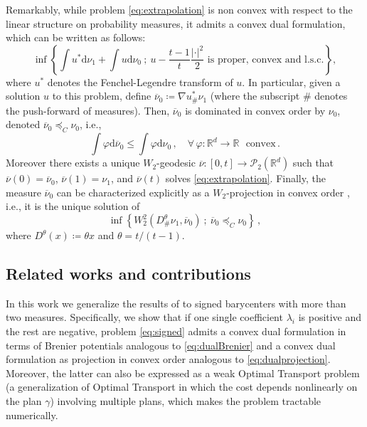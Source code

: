 \documentclass[12pt]{amsart}
\numberwithin{equation}{section}
\let\mc=\mathcal
\def\ed{\mathrm{d}}
\theoremstyle{plain}
\theoremstyle{definition}
\begin{document}
Remarkably, while problem \eqref{eq:extrapolation} is non convex with respect to the linear structure on probability measures, it admits a convex dual formulation, which can be written as follows:
\begin{equation}\label{eq:dualBrenier} 
\inf \left \{ \int u^* \mathrm{d} \nu_1  + \int u \mathrm{d} \nu_0 ~;~ u - \frac{t-1}{t} \frac{|\cdot|^2}{2} \text{ is proper, convex {and l.s.c.}} \right\},
\end{equation}
where $u^*$ denotes the Fenchel-Legendre transform of $u$.
In particular, given a solution $u$ to this problem, define $\overline{\nu}_0 \coloneqq \nabla u^*_\# \nu_1$ (where the subscript $\#$ denotes the push-forward of measures). Then, $\overline{\nu}_0$ is dominated in convex order by $\nu_0$, denoted $\overline{\nu}_0 \preceq_C \nu_0$, i.e.,
\[
\int \varphi \ed \overline{\nu}_0 \leq \int \varphi \ed \nu_0 \,, \quad \forall \, \varphi:\mathbb{R}^d \rightarrow \mathbb{R} ~~~ \text{convex}\,.
\]
Moreover there exists a unique $W_2$-geodesic $\overline{\nu}:[0,t] \rightarrow \mc{P}_2(\mathbb{R}^d)$ such that $\overline{\nu}(0) = \overline{\nu}_0$,  $\overline{\nu}(1) = \nu_1$, and  $\overline{\nu}(t)$ solves \eqref{eq:extrapolation}. Finally, the measure $\overline{\nu}_0$ can be characterized explicitly as a $W_2$-projection in convex order \cite{kim2026stability}, i.e., it is the unique solution of
\begin{equation}\label{eq:dualprojection}
\inf \left\{ W^2_2 (D^\theta_\# \nu_1, \overline{\nu}_0) ~;~  \overline{\nu}_0 \preceq_C \nu_0 \right\}\,,
\end{equation}
where $D^\theta(x) \coloneqq  \theta x$ and $\theta = t/(t-1)$.

\subsection{Related works and contributions} In this work we 
generalize the results of \cite{gallouet2025metric} to signed barycenters with more than two measures. Specifically, we show that if one single coefficient $\lambda_i$ is positive and the rest are negative, problem \eqref{eq:signed} admits a convex dual formulation in terms of Brenier potentials analogous to \eqref{eq:dualBrenier} and a convex dual formulation as projection in convex order analogous to \eqref{eq:dualprojection}. Moreover, the latter can also be expressed as a weak Optimal Transport problem \cite{gozlan2017kantorovich,gozlan2020mixture} (a  generalization of Optimal Transport in which the cost depends nonlinearly on the plan $\gamma$) involving multiple plans, which makes the problem tractable numerically.
\end{document}
